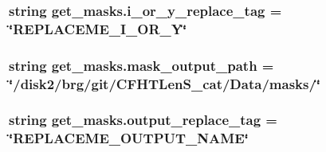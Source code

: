 \hypertarget{namespaceget__masks_aeefd8d2fe08e35ede8f9e5f04e7e451e}{
\subsubsection[{i\-\_\-or\-\_\-y\-\_\-replace\-\_\-tag}]{\setlength{\rightskip}{0pt plus 5cm}string get\-\_\-masks.\-i\-\_\-or\-\_\-y\-\_\-replace\-\_\-tag = \char`\"{}R\-E\-P\-L\-A\-C\-E\-M\-E\-\_\-\-I\-\_\-\-O\-R\-\_\-\-Y\char`\"{}}}\label{namespaceget__masks_aeefd8d2fe08e35ede8f9e5f04e7e451e}
\hypertarget{namespaceget__masks_a2b36e96dbe06aff7c726295a0f34af97}{
\subsubsection[{mask\-\_\-output\-\_\-path}]{\setlength{\rightskip}{0pt plus 5cm}string get\-\_\-masks.\-mask\-\_\-output\-\_\-path = \char`\"{}/disk2/brg/git/C\-F\-H\-T\-Len\-S\-\_\-cat/Data/masks/\char`\"{}}}\label{namespaceget__masks_a2b36e96dbe06aff7c726295a0f34af97}
\hypertarget{namespaceget__masks_aa6a6668dc8737ccc73f1cd09d0c998ad}{
\subsubsection[{output\-\_\-replace\-\_\-tag}]{\setlength{\rightskip}{0pt plus 5cm}string get\-\_\-masks.\-output\-\_\-replace\-\_\-tag = \char`\"{}R\-E\-P\-L\-A\-C\-E\-M\-E\-\_\-\-O\-U\-T\-P\-U\-T\-\_\-\-N\-A\-M\-E\char`\"{}}}\label{namespaceget__masks_aa6a6668dc8737ccc73f1cd09d0c998ad}
